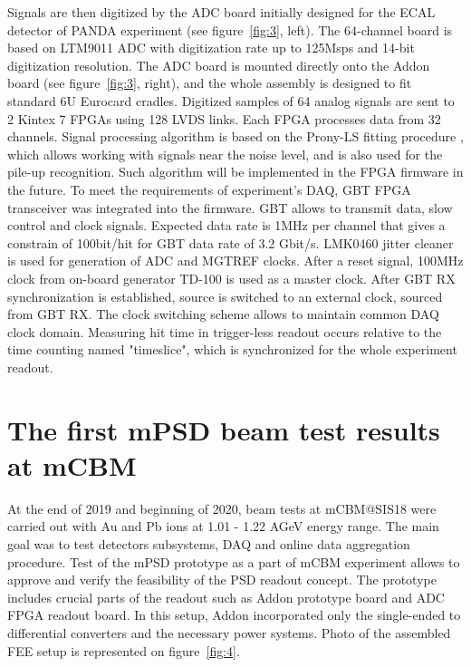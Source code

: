 \documentclass[a4paper,11pt]{article}
\begin{document}
Signals are then digitized by the ADC board initially designed for the ECAL detector of PANDA experiment \cite{5} (see figure~\ref{fig:3}, left). The 64-channel board is based on LTM9011 ADC with digitization rate up to 125Msps and 14-bit digitization resolution. The ADC board is mounted directly onto the Addon board (see figure~\ref{fig:3}, right), and the whole assembly is designed to fit standard 6U Eurocard cradles.
Digitized samples of 64 analog signals are sent to 2 Kintex 7 FPGAs using 128 LVDS links. Each FPGA processes data from 32 channels. Signal processing algorithm is based on the Prony-LS fitting procedure \cite{6}, which allows working with signals near the noise level, and is also used for the pile-up recognition. Such algorithm will be implemented in the FPGA firmware in the future.
To meet the requirements of experiment's DAQ, GBT FPGA transceiver was integrated into the firmware. GBT allows to transmit data, slow control and clock signals. Expected data rate is 1MHz per channel that gives a constrain of 100bit/hit for GBT data rate of 3.2 Gbit/s. 
LMK0460 jitter cleaner is used for generation of ADC and MGTREF clocks. After a reset signal, 100MHz clock from on-board generator TD-100 is used as a master clock. After GBT RX synchronization is established, source is switched to an external clock, sourced from GBT RX. The clock switching scheme allows to maintain common DAQ clock domain. Measuring hit time in trigger-less readout occurs relative to the time counting named "timeslice", which is synchronized for the whole experiment readout.


\section{ The first mPSD beam test results at mCBM}
At the end of 2019 and beginning of 2020, beam tests at mCBM@SIS18 were carried out with Au and Pb ions at 1.01 - 1.22 AGeV energy range. The main goal was to test detectors subsystems, DAQ and online data aggregation procedure. Test of the mPSD prototype as a part of mCBM experiment allows to approve and verify the feasibility of the PSD readout concept. The prototype includes crucial parts of the readout such as Addon prototype board and ADC FPGA readout board. In this setup, Addon incorporated only the single-ended to differential converters and the necessary power systems. Photo of the assembled FEE setup is represented on figure~\ref{fig:4}.
\end{document}
